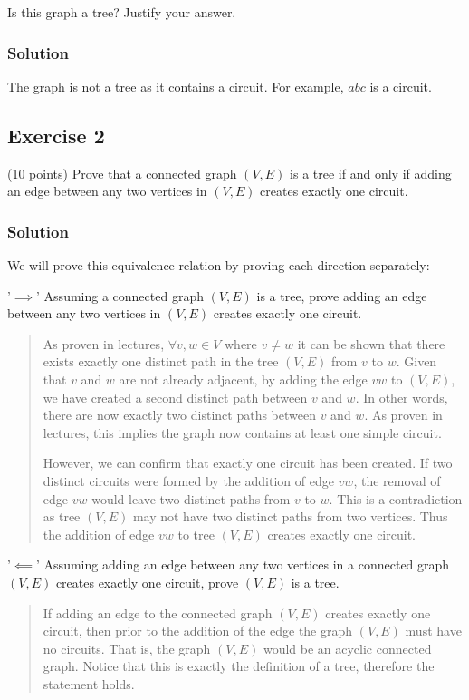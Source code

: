 \documentclass[12pt]{article}
\begin{document}
Is this graph a tree? Justify your answer.

\subsubsection*{Solution}

The graph is not a tree as it contains a circuit. For example, $abc$ is a circuit.

\pagebreak
\subsection*{Exercise 2}

(10 points) Prove that a connected graph $(V,E)$ is a tree if and only if adding an edge between any two vertices in $(V,E)$ creates exactly one circuit.

\subsubsection*{Solution}

We will prove this equivalence relation by proving each direction separately:

'$\implies$' Assuming a connected graph $(V,E)$ is a tree, prove adding an edge between any two vertices in $(V,E)$ creates exactly one circuit.
\begin{quote}
	As proven in lectures, $\forall v,w \in V$ where $v \ne w$ it can be shown that there exists exactly one distinct path in the tree $(V,E)$ from $v$ to $w$.
	Given that $v$ and $w$ are not already adjacent, by adding the edge $vw$ to $(V,E)$, we have created a second distinct path between $v$ and $w$.
	In other words, there are now exactly two distinct paths between $v$ and $w$. As proven in lectures, this implies the graph now contains at least one simple circuit.

	However, we can confirm that exactly one circuit has been created.
	If two distinct circuits were formed by the addition of edge $vw$, the removal of edge $vw$ would leave two distinct paths from $v$ to $w$.
	This is a contradiction as tree $(V,E)$ may not have two distinct paths from two vertices.
	Thus the addition of edge $vw$ to tree $(V,E)$ creates exactly one circuit.
\end{quote}

'$\impliedby$' Assuming adding an edge between any two vertices in a connected graph $(V,E)$ creates exactly one circuit, prove $(V,E)$ is a tree.
\begin{quote}
	If adding an edge to the connected graph $(V,E)$ creates exactly one circuit, then prior to the addition of the edge the graph $(V,E)$ must have no circuits.
	That is, the graph $(V,E)$ would be an acyclic connected graph. Notice that this is exactly the definition of a tree, therefore the statement holds.
\end{quote}
\end{document}

